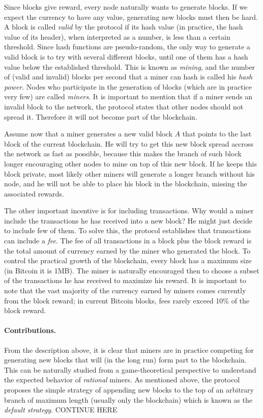 Since blocks give reward, every node naturally wants to generate blocks. If we expect the currency to have any value, generating new blocks must then be hard. A block is called \emph{valid} by the protocol if its hash value (in practice, the hash value of its header), when interpreted as a number, is less than a certain threshold. Since hash functions are pseudo-random, the only way to generate a valid block is to try with several different blocks, until one of them has a hash value below the established threshold. This is known as \emph{mining}, and the number of (valid and invalid) blocks per second that a miner can hash is called his \emph{hash power}. Nodes who participate in the generation of blocks (which are in practice very few) are called \emph{miners}. It is important to mention that if a miner sends an invalid block to the network, the protocol states that other nodes should not spread it. Therefore it will not become part of the blockchain.

Assume now that a miner generates a new valid block $A$ that points to the last block of the current blockchain. He will try to get this new block spread accross the network as fast as possible, because this makes the branch of such block longer encouraging other nodes to mine on top of this new block. If he keeps this block private, most likely other miners will generate a longer branch without his node, and he will not be able to place his block in the blockchain, missing the associated rewards.

The other important incentive is for including transactions. Why would a miner include the transactions he has received into a new block? He might just decide to include few of them. To solve this, the protocol establishes that transactions can include a \emph{fee}. The fee of all transactions in a block plus the block reward is the total amount of currency earned by the miner who generated the block. To control the practical growth of the blockchain, every block has a maximum size (in Bitcoin it is 1MB). The miner is naturally encouraged then to choose a subset of the transactions he has received to maximize his reward. It is important to note that the vast majority of the currency earned by miners comes currently from the block reward; in current Bitcoin blocks, fees rarely exceed 10\% of the block reward.

\paragraph*{\bf Contributions.} From the description above, it is clear that miners are in practice competing for generating new blocks that will (in the long run) form part to the blockchain. This can be naturally studied from a game-theoretical perspective to understand the expected behavior of \emph{rational} miners. As mentioned above, the protocol proposes the simple strategy of appending new blocks to the top of an arbitrary branch of maximum length (usually only the blockchain) which is known as the \emph{default strategy}. CONTINUE HERE


